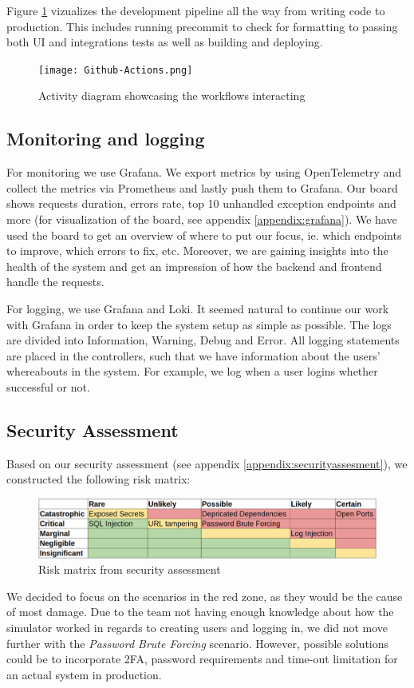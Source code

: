 Figure \ref{fig:workflows} vizualizes the development pipeline all the way from writing code to production. This includes running precommit to check for formatting to passing both UI and integrations tests as well as building and deploying.

\begin{figure}[H]
    \centering
    \texttt{[image: Github-Actions.png]}
    \caption{Activity diagram showcasing the workflows interacting }
    \label{fig:workflows}
\end{figure}

\subsection{Monitoring and logging}
For monitoring we use Grafana. We export metrics by using OpenTelemetry and collect the metrics via Prometheus and lastly push them to Grafana. Our board shows requests duration, errors rate, top 10 unhandled exception endpoints and more (for visualization of the board, see appendix \ref{appendix:grafana}). We have used the board to get an overview of where to put our focus, ie. which endpoints to improve, which errors to fix, etc. Moreover, we are gaining insights into the health of the system and get an impression of how the backend and frontend handle the requests.

For logging, we use Grafana and Loki. It seemed natural to continue our work with Grafana in order to keep the system setup as simple as possible. The logs are divided into Information, Warning, Debug and Error. All logging statements are placed in the controllers, such that we have information about the users' whereabouts in the system. For example, we log when a user logins whether successful or not.

\subsection{Security Assessment}
Based on our security assessment (see appendix \ref{appendix:securityassesment}), we constructed the following risk matrix:
\begin{figure}[H]
    \centering
    \includegraphics[width=1\linewidth]{images/risk-matrix.png}
    \caption{Risk matrix from security assessment}
    \label{fig:enter-label}
\end{figure}
We decided to focus on the scenarios in the red zone, as they would be the cause of most damage. Due to the team not having enough knowledge about how the simulator worked in regards to creating users and logging in, we did not move further with the \textit{Password Brute Forcing} scenario. However, possible solutions could be to incorporate 2FA, password requirements and time-out limitation for an actual system in production.

